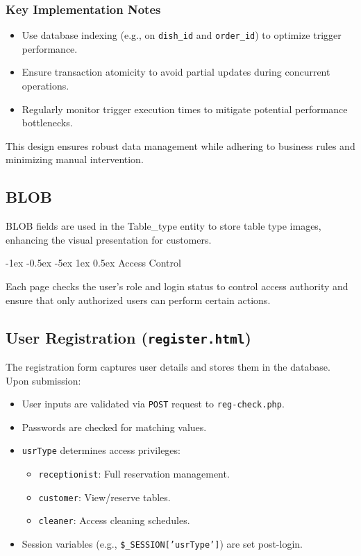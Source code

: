 \documentclass[12pt]{article}
\makeatletter
\renewcommand\section{\@startsection{section}{1}{\z@}%
    {-1ex \@plus -0.5ex \@minus -5ex} %
    {1ex \@plus 0.5ex} %
    {\normalfont\Large\bfseries}} %
\makeatother
\begin{document}
\subsubsection*{Key Implementation Notes}
\begin{itemize}
\item Use database indexing (e.g., on \texttt{dish\_id} and \texttt{order\_id}) to optimize trigger performance.
\item Ensure transaction atomicity to avoid partial updates during concurrent operations.
\item Regularly monitor trigger execution times to mitigate potential performance bottlenecks.
\end{itemize}

This design ensures robust data management while adhering to business rules and minimizing manual intervention.

\subsection{BLOB}
BLOB fields are used in the Table\_type entity to store table type images, enhancing the visual presentation for customers.


\section{Access Control}

Each page checks the user's role and login status to control access authority and ensure that only authorized users can perform certain actions.

\subsection{User Registration (\texttt{register.html})}

The registration form captures user details and stores them in the database. Upon submission:

\begin{itemize}
    \item User inputs are validated via \texttt{POST} request to \texttt{reg-check.php}.
    \item Passwords are checked for matching values.
    \item \texttt{usrType} determines access privileges:
    \begin{itemize}
        \item \texttt{receptionist}: Full reservation management.
        \item \texttt{customer}: View/reserve tables.
        \item \texttt{cleaner}: Access cleaning schedules.
    \end{itemize}
    \item Session variables (e.g., \texttt{\$\_SESSION['usrType']}) are set post-login.
\end{itemize}
\end{document}
